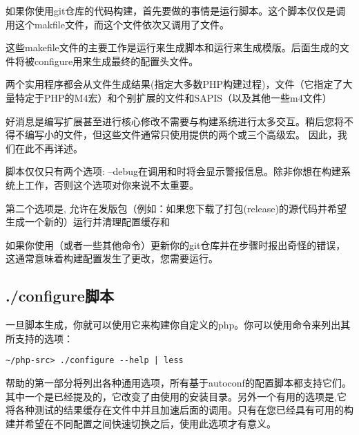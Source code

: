 如果你使用git仓库的代码构建，首先要做的事情是运行脚本。这个脚本仅仅是调用这个makfile文件，而这个文件依次又调用了文件。

这些makefile文件的主要工作是运行来生成脚本和运行来生成模版。后面生成的文件将被configure用来生成最终的配置头文件。

两个实用程序都会从文件生成结果(指定大多数PHP构建过程)，文件（它指定了大量特定于PHP的M4宏）和个别扩展的文件和SAPIS（以及其他一些m4文件）

好消息是编写扩展甚至进行核心修改不需要与构建系统进行太多交互。稍后您将不得不编写小的文件，但这些文件通常只使用提供的两个或三个高级宏。 因此，我们在此不再详述。

脚本仅仅只有两个选项: --debug在调用和时将会显示警报信息。除非你想在构建系统上工作，否则这个选项对你来说不太重要。

第二个选项是, 允许在发版包（例如：如果您下载了打包(release)的源代码并希望生成一个新的）运行并清理配置缓存和

如果你使用（或者一些其他命令）更新你的git仓库并在步骤时报出奇怪的错误，这通常意味着构建配置发生了更改，您需要运行。


\subsection{./configure脚本}

一旦脚本生成，你就可以使用它来构建你自定义的php。你可以使用命令来列出其所支持的选项：

\begin{lstlisting}[language=shell]
~/php-src> ./configure --help | less
\end{lstlisting}

帮助的第一部分将列出各种通用选项，所有基于autoconf的配置脚本都支持它们。其中一个是已经提及的，它改变了由使用的安装目录。另外一个有用的选项是,它将各种测试的结果缓存在文件中并且加速后面的调用。只有在您已经具有可用的构建并希望在不同配置之间快速切换之后，使用此选项才有意义。

